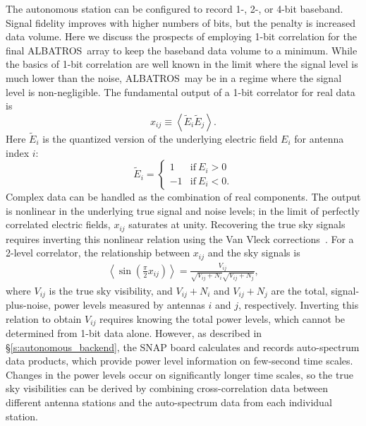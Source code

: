 \documentclass{ws-jai}
\def\albatros{ALBATROS}
\begin{document}
The autonomous station can be configured to record 1-, 2-, or 4-bit
baseband.  Signal fidelity improves with higher numbers of bits, but
the penalty is increased data volume.  Here we discuss the prospects
of employing 1-bit correlation for the final \albatros\ array to keep
the baseband data volume to a minimum.  While the basics of 1-bit
correlation are well known in the limit where the signal level is much
lower than the noise, \albatros\ may be in a regime where the signal
level is non-negligible.  The fundamental output of a 1-bit correlator
for real data is
\begin{equation}
  x_{ij} \equiv \left < \tilde{E}_i \tilde{E}_j \right >.
\end{equation}
Here $\tilde{E}_i$ is the quantized version of the underlying electric
field $E_i$ for antenna index $i$:
\begin{equation}
  \tilde{E}_i=
  \begin{cases}
    1 & \text{if}\ E_i > 0 \\
    -1 & \text{if}\ E_i < 0.
  \end{cases}
\end{equation}
Complex data can be handled as the combination of real components.
The output is nonlinear in the underlying true signal and noise
levels; in the limit of perfectly correlated electric fields, $x_{ij}$
saturates at unity.  Recovering the true sky signals requires
inverting this nonlinear relation using the Van Vleck
corrections~\citep{1446497}.  For a 2-level correlator, the
relationship between $x_{ij}$ and the sky signals
is~\citep{1989ASPC....6...59D}
\begin{eqnarray}
\label{eqn:1bit_output}
\left < \sin\left(\frac{\pi}{2}x_{ij}\right)\right > = \frac{V_{ij}}{\sqrt{V_{ij}+N_i}\sqrt{V_{ij}+N_j}},
\end{eqnarray}
where $V_{ij}$ is the true sky visibility, and $V_{ij}+N_{i}$ and
$V_{ij}+N_{j}$ are the total, signal-plus-noise, power levels measured
by antennas $i$ and $j$, respectively.  Inverting this relation to
obtain $V_{ij}$ requires knowing the total power levels, which cannot
be determined from 1-bit data alone.  However, as described in
\S\ref{s:autonomous_backend}, the SNAP board calculates and records
auto-spectrum data products, which provide power level information on
few-second time scales.  Changes in the power levels occur on
significantly longer time scales, so the true sky visibilities can be
derived by combining cross-correlation data between different antenna
stations and the auto-spectrum data from each individual station.
\end{document}
